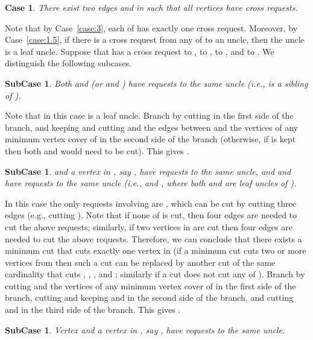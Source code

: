 \documentclass[11pt]{article}
\newtheorem{case}[theorem]{Case}
\newtheorem{subcase}[theorem]{SubCase}
\begin{document}
\begin{case}\label{case:7}
There exist two edges  and  in  such that all vertices  have cross requests.
\end{case}

Note that by Case~\ref{case:3}, each of  has exactly one cross request. Moreover, by Case~\ref{case:1.5}, if there is a cross request from any of  to an uncle, then the uncle is a leaf uncle.  Suppose that  has a cross request to ,  to ,  to , and  to . We distinguish the following subcases.

\begin{subcase}
\label{subcase:71}
Both  and  (or  and ) have requests to the same uncle (i.e.,  is a sibling of ).
\end{subcase}

Note that in this case  is a leaf uncle. Branch by cutting  in the first side of the branch, and keeping  and cutting  and the edges between  and the vertices of any minimum vertex cover of  in the second side of the branch (otherwise, if  is kept then both  and  would need to be cut). This gives .


\begin{subcase}
\label{subcase:72}
 and a vertex in , say , have requests to the same uncle, and  and  have requests to the same uncle (i.e.,  and , where both  and  are leaf uncles of ).
\end{subcase}
In this case the only requests involving  are , which can be cut by cutting three edges (e.g., cutting ). Note that if none of  is cut, then four edges are needed to cut the above requests; similarly, if two vertices in  are cut then four edges are needed to cut the above requests. Therefore, we can conclude that there exists a minimum cut that cuts exactly one vertex in  (if a minimum cut cuts two or more vertices from  then such a cut can be replaced by another cut of the same cardinality that cuts , , , and ; similarly if a cut does not cut any of ).  Branch by cutting  and the vertices of any minimum vertex cover of  in the first side of the branch, cutting  and keeping  and  in the second side of the branch, and cutting  and in the third side of the branch. This gives .



\begin{subcase}
\label{subcase:73}
Vertex  and a vertex in , say , have requests to the same uncle.
\end{subcase}
\end{document}
